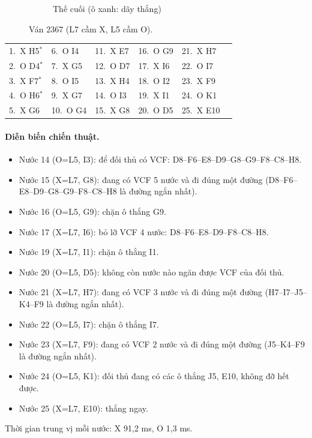 \begin{figure}[H]
\begin{subfigure}[t]{.48\linewidth}
    \caption{Thế cuối (ô xanh: dãy thắng)}
  \end{subfigure}
  \caption{Ván 2367 (L7 cầm X, L5 cầm O).}
  \label{fig:cs-van-24}
\end{figure}
{\footnotesize\linespread{1}\selectfont
\noindent\begin{tabularx}{\linewidth}{*{6}{X}}
\toprule
1.~X H5$^\ast$ & 6.~O I4 & 11.~X E7 & 16.~O G9 & 21.~X H7 &  \\
2.~O D4$^\ast$ & 7.~X G5 & 12.~O D7 & 17.~X I6 & 22.~O I7 &  \\
3.~X F7$^\ast$ & 8.~O I5 & 13.~X H4 & 18.~O I2 & 23.~X F9 &  \\
4.~O H6$^\ast$ & 9.~X G7 & 14.~O I3 & 19.~X I1 & 24.~O K1 &  \\
5.~X G6 & 10.~O G4 & 15.~X G8 & 20.~O D5 & 25.~X E10 &  \\
\bottomrule
\end{tabularx}\par}
\paragraph{Diễn biến chiến thuật.}
\begin{itemize}\small
\setlength{\itemsep}{0pt}
  \item Nước 14 (O=L5, I3): để đối thủ có VCF: D8--F6--E8--D9--G8--G9--F8--C8--H8.
  \item Nước 15 (X=L7, G8): đang có VCF 5 nước và đi đúng một đường (D8--F6--E8--D9--G8--G9--F8--C8--H8 là đường ngắn nhất).
  \item Nước 16 (O=L5, G9): chặn ô thắng G9.
  \item Nước 17 (X=L7, I6): bỏ lỡ VCF 4 nước: D8--F6--E8--D9--F8--C8--H8.
  \item Nước 19 (X=L7, I1): chặn ô thắng I1.
  \item Nước 20 (O=L5, D5): không còn nước nào ngăn được VCF của đối thủ.
  \item Nước 21 (X=L7, H7): đang có VCF 3 nước và đi đúng một đường (H7--I7--J5--K4--F9 là đường ngắn nhất).
  \item Nước 22 (O=L5, I7): chặn ô thắng I7.
  \item Nước 23 (X=L7, F9): đang có VCF 2 nước và đi đúng một đường (J5--K4--F9 là đường ngắn nhất).
  \item Nước 24 (O=L5, K1): đối thủ đang có các ô thắng J5, E10, không đỡ hết được.
  \item Nước 25 (X=L7, E10): thắng ngay.
\end{itemize}
Thời gian trung vị mỗi nước: X 91,2 ms, O 1,3 ms.
\clearpage


